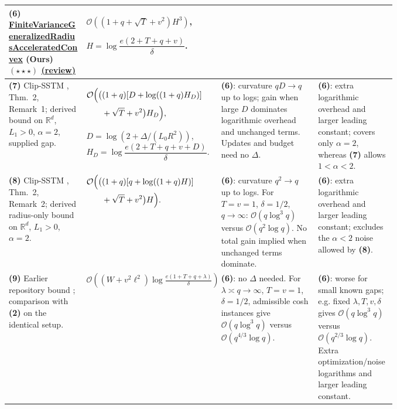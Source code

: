 \begin{table}[tp]
\begin{threeparttable}
\begin{tabularx}{\linewidth}{@{}>{\raggedright\arraybackslash}p{0.20\linewidth}>{\raggedright\arraybackslash}p{0.32\linewidth}>{\raggedright\arraybackslash}p{0.25\linewidth}>{\raggedright\arraybackslash}X@{}}
\midrule
\textbf{(6)} \href{https://github.com/k3nfalt/longtails/blob/main/LongTails/Theorems/FiniteVarianceGeneralizedRadiusAcceleratedConvex.lean}{Finite\allowbreak Variance\allowbreak Generalized\allowbreak Radius\allowbreak Accelerated\allowbreak Convex} \textbf{(Ours)} $(\star\star\star)$ \href{https://github.com/k3nfalt/longtails/blob/main/scripts/reviews/FiniteVarianceGeneralizedRadiusAcceleratedConvex.md}{(review)}
& $\mathcal{O}\!\left((1+q+\sqrt T+v^2)H^3\right)$,
\par $H=\log\!\dfrac{e(2+T+q+v)}{\delta}$.
& & \\
\midrule[1.2pt]
\textbf{(7)} Clip-SSTM \citep{fvRadiusElKadi2026v2}, Thm.~2, Remark~1; derived bound on $\mathbb R^d$, $L_1>0$, $\alpha=2$, supplied gap.
& $\begin{aligned}[t]\mathcal{O}\Bigl(\bigl(& (1+q)[D+\log((1+q)H_D)]\\
&+\sqrt T+v^2\bigr)H_D\Bigr),\end{aligned}$
\par $D=\log(2+\Delta/(L_0R^2))$,
$H_D=\log\!\dfrac{e(2+T+q+v+D)}{\delta}$.
& \textbf{(6)}: curvature $qD\to q$ up to logs; gain when large $D$ dominates logarithmic overhead and unchanged terms. Updates and budget need no $\Delta$.
& \textbf{(6)}: extra logarithmic overhead and larger leading constant; covers only $\alpha=2$, whereas \textbf{(7)} allows $1<\alpha<2$. \\
\midrule
\textbf{(8)} Clip-SSTM \citep{fvRadiusElKadi2026v2}, Thm.~2, Remark~2; derived radius-only bound on $\mathbb R^d$, $L_1>0$, $\alpha=2$.
& $\begin{aligned}[t]\mathcal{O}\Bigl(\bigl(& (1+q)[q+\log((1+q)H)]\\
&+\sqrt T+v^2\bigr)H\Bigr).
\end{aligned}$
& \textbf{(6)}: curvature $q^2\to q$ up to logs. For $T=v=1$, $\delta=1/2$, $q\to\infty$: $\mathcal{O}(q\log^3q)$ versus $\mathcal{O}(q^2\log q)$. No total gain implied when unchanged terms dominate.
& \textbf{(6)}: extra logarithmic overhead and larger leading constant; excludes the $\alpha<2$ noise allowed by \textbf{(8)}. \\
\midrule
\textbf{(9)} Earlier repository bound \citep{fvRadiusEarlierRepository}; comparison with \textbf{(2)} on the identical setup.
& $\mathcal{O}\!\left((W+v^2\ell^2)\log\frac{e(1+T+q+\lambda)}{\delta}\right)$
& \textbf{(6)}: no $\Delta$ needed. For $\lambda\asymp q\to\infty$, $T=v=1$, $\delta=1/2$, admissible cosh instances give $\mathcal{O}(q\log^3q)$ versus $\mathcal{O}(q^{4/3}\log q)$.
& \textbf{(6)}: worse for small known gaps; e.g. fixed $\lambda,T,v,\delta$ gives $\mathcal{O}(q\log^3q)$ versus $\mathcal{O}(q^{2/3}\log q)$. Extra optimization/noise logarithms and larger leading constant. \\

\end{tabularx}
\end{threeparttable}
\end{table}
